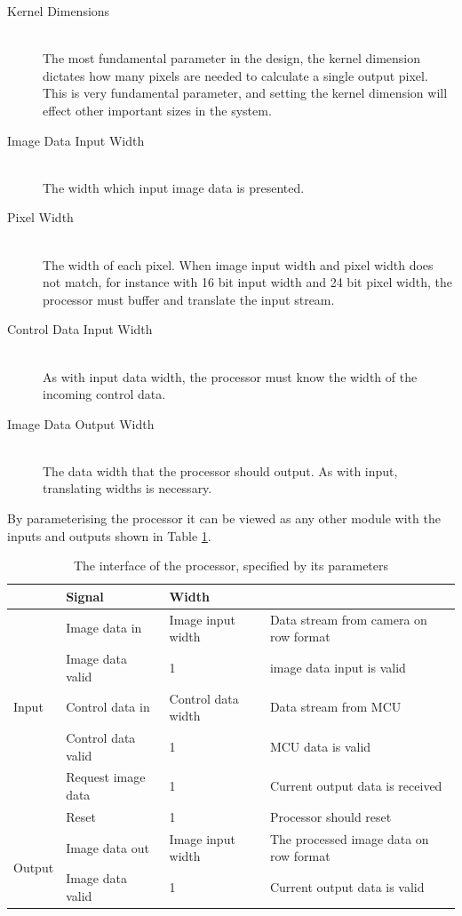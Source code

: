 \begin{description}
    \item[Kernel Dimensions] \hfill \\
        The most fundamental parameter in the design, the kernel dimension dictates how many pixels are needed to calculate a single output pixel.
        This is very fundamental parameter, and setting the kernel dimension will effect other important sizes in the system.
    \item[Image Data Input Width] \hfill \\
        The width which input image data is presented.
    \item[Pixel Width] \hfill \\
        The width of each pixel. When image input width and pixel width does not match, for instance with 16 bit input width and 24 bit pixel width, the processor must buffer and translate the input stream.
    \item[Control Data Input Width] \hfill \\
        As with input data width, the processor must know the width of the incoming control data.
    \item[Image Data Output Width] \hfill \\
        The data width that the processor should output. As with input, translating widths is necessary.
\end{description}

By parameterising the processor it can be viewed as any other module with the inputs and outputs shown in Table \ref{tbl:ConvolutionEngineIO}.

\begin{table}[h]
    \begin{tabular}{l | l | l | l }
        &   Signal & Width\\
        \hline
        \multirow{5}{*}{Input}
        &   Image data in           & Image input width     & Data stream from camera on row format
        \\
        &   Image data valid        & 1                     & image data input is valid
        \\
        &   Control data in         & Control data width    & Data stream from MCU
        \\
        &   Control data valid      & 1                     & MCU data is valid
        \\
        &   Request image data      & 1                     & Current output data is received
        \\
        &   Reset                   & 1                     & Processor should reset
        \\\hline
        \multirow{2}{*}{Output}
        &   Image data out          & Image input width     & The processed image data on row format\\
        &   Image data valid        & 1                     & Current output data is valid
    \end{tabular}
    \caption{The interface of the processor, specified by its parameters}
    \label{tbl:ConvolutionEngineIO}
\end{table}

